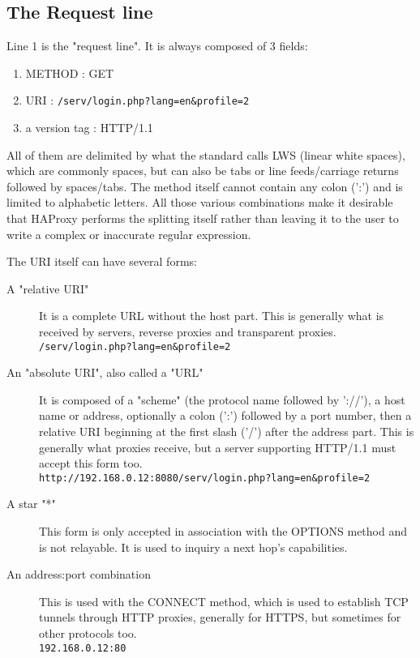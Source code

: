 \subsection{The Request line}
Line 1 is the "request line". It is always composed of 3 fields:

\begin{enumerate}
  \item METHOD : GET
  \item URI : \verb|/serv/login.php?lang=en&profile=2|
  \item a version tag : HTTP/1.1
\end{enumerate}

All of them are delimited by what the standard calls LWS (linear white spaces),
which are commonly spaces, but can also be tabs or line feeds/carriage returns
followed by spaces/tabs. The method itself cannot contain any colon (':') and
is limited to alphabetic letters. All those various combinations make it
desirable that HAProxy performs the splitting itself rather than leaving it to
the user to write a complex or inaccurate regular expression.

The URI itself can have several forms:

\begin{description}
\item[A "relative URI"]
    It is a complete URL without the host part. This is generally what is
    received by servers, reverse proxies and transparent proxies.\\
    \verb|/serv/login.php?lang=en&profile=2|

\item[An "absolute URI", also called a "URL"]
    It is composed of a "scheme" (the protocol name followed by '://'), a host
    name or address, optionally a colon (':') followed by a port number, then
    a relative URI beginning at the first slash ('/') after the address part.
    This is generally what proxies receive, but a server supporting HTTP/1.1
    must accept this form too.\\
    \verb|http://192.168.0.12:8080/serv/login.php?lang=en&profile=2|

\item[A star "*"]
    This form is only accepted in association with the OPTIONS
    method and is not relayable. It is used to inquiry a next hop's
    capabilities.

\item[An address:port combination]
    This is used with the CONNECT method, which is used to establish TCP
    tunnels through HTTP proxies, generally for HTTPS, but sometimes for
    other protocols too.\\
    \verb|192.168.0.12:80|
\end{description}


